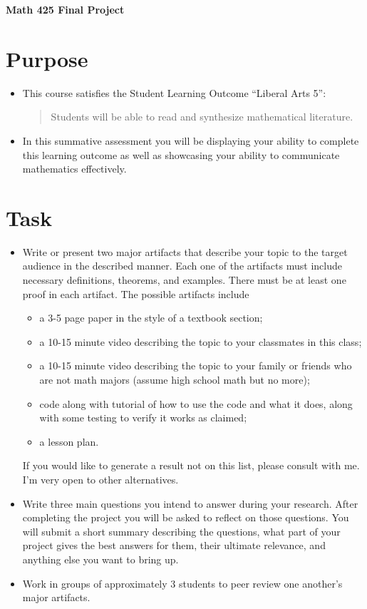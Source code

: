 \documentclass[12pt]{article}
\begin{document}
	\begin{center}
		{\Large \bf Math 425 Final Project}
	\end{center}
	\section*{Purpose}
	\begin{itemize}
		\item This course satisfies the Student Learning Outcome ``Liberal Arts 5'':
			\begin{quote}
				Students will be able to read and synthesize mathematical literature.
			\end{quote}
		\item In this summative assessment you will be displaying your ability to complete this learning outcome as well as showcasing your ability to communicate mathematics effectively.
	\end{itemize}
	\section*{Task}
	\begin{itemize}
		\item Write or present two major artifacts that describe your topic to the target audience in the described manner. Each one of the artifacts must include necessary definitions, theorems, and examples. There must be at least one proof in each artifact. The possible artifacts include
			\begin{itemize}
				\item a 3-5 page paper in the style of a textbook section;
				\item a 10-15 minute video describing the topic to your classmates in this class;
				\item a 10-15 minute video describing the topic to your family or friends who are not math majors (assume high school math but no more);
				\item code along with tutorial of how to use the code and what it does, along with some testing to verify it works as claimed;
				\item a lesson plan.
			\end{itemize}
			If you would like to generate a result not on this list, please consult with me. I'm very open to other alternatives.
		\item Write three main questions you intend to answer during your research. After completing the project you will be asked to reflect on those questions. You will submit a short summary describing the questions, what part of your project gives the best answers for them, their ultimate relevance, and anything else you want to bring up. 
		\item Work in groups of approximately 3 students to peer review one another's major artifacts.
	\end{itemize}
\end{document}
